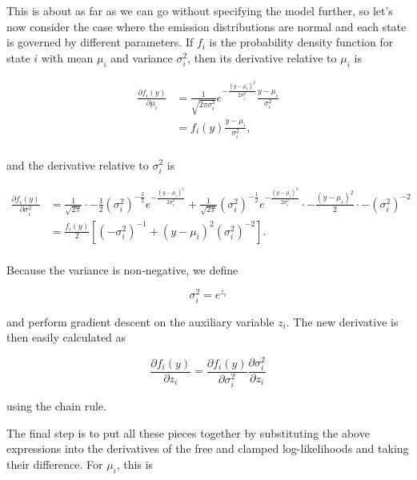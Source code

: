 This is about as far as we can go without specifying the model further, so let's now consider the case where the emission distributions are normal and each state is governed by different parameters. If $f_i$ is the probability density function for state $i$ with mean $\mu_i$ and variance $\sigma_i^2$, then its derivative relative to $\mu_i$ is

\begin{align*}
\frac{\partial f_i(y)}{\partial \mu_i}
&= \frac{1}{\sqrt{2\pi\sigma_i^2}}
   e^{-\frac{\left( y-\mu_i \right)^2}{2\sigma_i^2}}
   \frac{y - \mu_i}{\sigma_i^2} \\
&= f_i(y) \frac{y - \mu_i}{\sigma_i^2}, \\
\end{align*}

and the derivative relative to $\sigma_i^2$ is

\begin{align*}
\frac{\partial f_i(y)}{\partial \sigma_i^2}
&= \frac{1}{\sqrt{2\pi}} \cdot -\frac{1}{2}
   \left( \sigma_i^2 \right)^{-\frac{3}{2}}
   e^{-\frac{\left( y-\mu_i \right)^2}{2\sigma_i^2}}
   +
   \frac{1}{\sqrt{2\pi}}
   \left( \sigma_i^2 \right)^{-\frac{1}{2}}
   e^{-\frac{\left( y-\mu_i \right)^2}{2\sigma_i^2}}
   \cdot -\frac{\left( y-\mu_i \right)^2}{2}
   \cdot -\left( \sigma_i^2 \right)^{-2} \\
&= \frac{f_i(y)}{2} \left[ \left( -\sigma_i^2 \right)^{-1}
                           + \left( y - \mu_i \right)^2 \left( \sigma_i^2 \right)^{-2}
                    \right]. \\
\end{align*}

Because the variance is non-negative, we define

\begin{equation*}
\sigma_i^2 = e^{z_i}
\end{equation*}

and perform gradient descent on the auxiliary variable $z_i$. The new derivative is then easily calculated as

\begin{equation*}
\frac{\partial f_i(y)}{\partial z_i} = \frac{\partial f_i(y)}{\partial \sigma_i^2}
                                        \frac{\partial \sigma_i^2}{\partial z_i}
\end{equation*}

using the chain rule.

The final step is to put all these pieces together by substituting the above expressions into the derivatives of the free and clamped log-likelihoods and taking their difference. For $\mu_i$, this is

